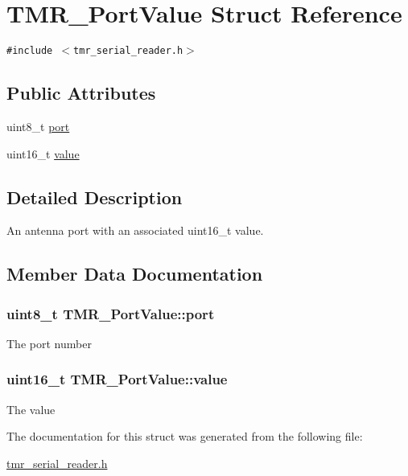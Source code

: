 \hypertarget{struct_t_m_r___port_value}{
\section{TMR\_\-PortValue Struct Reference}
\label{struct_t_m_r___port_value}
}
{\tt \#include $<$tmr\_\-serial\_\-reader.h$>$}

\subsection*{Public Attributes}
\begin{CompactItemize}
\item 
uint8\_\-t \hyperlink{struct_t_m_r___port_value_a1787406a64d809d0a9bcdcc044fbb5e}{port}
\item 
uint16\_\-t \hyperlink{struct_t_m_r___port_value_c01093738f785fdc46bda3eea024a7f9}{value}
\end{CompactItemize}


\subsection{Detailed Description}
An antenna port with an associated uint16\_\-t value. 

\subsection{Member Data Documentation}
\hypertarget{struct_t_m_r___port_value_a1787406a64d809d0a9bcdcc044fbb5e}{
\subsubsection[{port}]{\setlength{\rightskip}{0pt plus 5cm}uint8\_\-t {\bf TMR\_\-PortValue::port}}}
\label{struct_t_m_r___port_value_a1787406a64d809d0a9bcdcc044fbb5e}


The port number \hypertarget{struct_t_m_r___port_value_c01093738f785fdc46bda3eea024a7f9}{
\subsubsection[{value}]{\setlength{\rightskip}{0pt plus 5cm}uint16\_\-t {\bf TMR\_\-PortValue::value}}}
\label{struct_t_m_r___port_value_c01093738f785fdc46bda3eea024a7f9}


The value 

The documentation for this struct was generated from the following file:\begin{CompactItemize}
\item 
\hyperlink{tmr__serial__reader_8h}{tmr\_\-serial\_\-reader.h}\end{CompactItemize}
